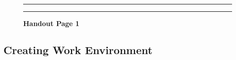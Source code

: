 \documentclass[]{article}
\begin{document}
\begin{figure}[!ht]
    \hrule
    \caption{ \textbf{Handout Page 1} }
    \begin{center}
    \end{center}
    \label{fig:handout-1}
    \hrule
\end{figure}

\newpage

\subsection{Creating Work Environment}
\label{sec:appendix-setup}
\end{document}
